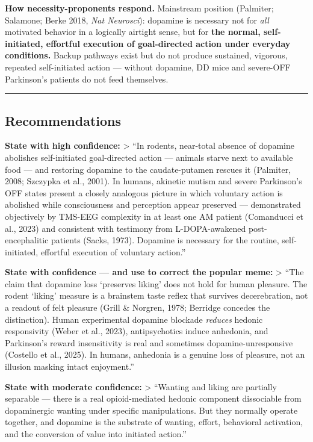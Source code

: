 \textbf{How necessity-proponents respond.} Mainstream position (Palmiter; Salamone; Berke 2018, \emph{Nat Neurosci}): dopamine is necessary not for \emph{all} motivated behavior in a logically airtight sense, but for \textbf{the normal, self-initiated, effortful execution of goal-directed action under everyday conditions.} Backup pathways exist but do not produce sustained, vigorous, repeated self-initiated action --- without dopamine, DD mice and severe-OFF Parkinson's patients do not feed themselves.

\begin{center}\rule{0.5\linewidth}{0.5pt}\end{center}

\subsection{Recommendations}\label{02_dopamine_action-recommendations}

\textbf{State with high confidence:} \textgreater{} ``In rodents, near-total absence of dopamine abolishes self-initiated goal-directed action --- animals starve next to available food --- and restoring dopamine to the caudate-putamen rescues it (Palmiter, 2008; Szczypka et al., 2001). In humans, akinetic mutism and severe Parkinson's OFF states present a closely analogous picture in which voluntary action is abolished while consciousness and perception appear preserved --- demonstrated objectively by TMS-EEG complexity in at least one AM patient (Comanducci et al., 2023) and consistent with testimony from L-DOPA-awakened post-encephalitic patients (Sacks, 1973). Dopamine is necessary for the routine, self-initiated, effortful execution of voluntary action.''

\textbf{State with confidence --- and use to correct the popular meme:} \textgreater{} ``The claim that dopamine loss `preserves liking' does not hold for human pleasure. The rodent `liking' measure is a brainstem taste reflex that survives decerebration, not a readout of felt pleasure (Grill \& Norgren, 1978; Berridge concedes the distinction). Human experimental dopamine blockade \emph{reduces} hedonic responsivity (Weber et al., 2023), antipsychotics induce anhedonia, and Parkinson's reward insensitivity is real and sometimes dopamine-unresponsive (Costello et al., 2025). In humans, anhedonia is a genuine loss of pleasure, not an illusion masking intact enjoyment.''

\textbf{State with moderate confidence:} \textgreater{} ``Wanting and liking are partially separable --- there is a real opioid-mediated hedonic component dissociable from dopaminergic wanting under specific manipulations. But they normally operate together, and dopamine is the substrate of wanting, effort, behavioral activation, and the conversion of value into initiated action.''

